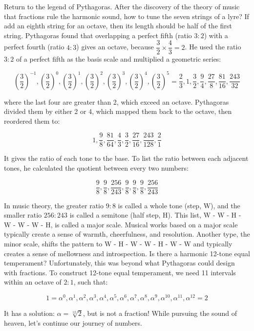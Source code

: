 \documentclass[b5paper]{article}
\begin{document}
\vspace{3mm}
Return to the legend of Pythagoras. After the discovery of the theory of music that fractions rule the harmonic sound, how to tune the seven strings of a lyre? If add an eighth string for an octave, then its length should be half of the first string. Pythagoras found that overlapping a perfect fifth (ratio $3:2$) with a perfect fourth (ratio $4:3$) gives an octave, because $\dfrac{3}{2} \times \dfrac{4}{3} = 2$. He used the ratio $3:2$ of a perfect fifth as the basis scale and multiplied a geometric series:

\[
(\frac{3}{2})^{-1}, (\frac{3}{2})^0, (\frac{3}{2})^{1}, (\frac{3}{2})^2, (\frac{3}{2})^{3}, (\frac{3}{2})^4, (\frac{3}{2})^{5} = \frac{2}{3}, 1, \frac{3}{2}, \frac{9}{4}, \frac{27}{8}, \frac{81}{16}, \frac{243}{32}
\]

where the last four are greater than 2, which exceed an octave. Pythagoras divided them by either 2 or 4, which mapped them back to the octave, then reordered them to:

\[
1, \frac{9}{8}, \frac{81}{64}, \frac{4}{3}, \frac{3}{2}, \frac{27}{16}, \frac{243}{128}, \frac{2}{1}
\]

It gives the ratio of each tone to the base. To list the ratio between each adjacent tones, he calculated the quotient between every two numbers:

\[
\frac{9}{8}, \frac{9}{8}, \frac{256}{243}, \frac{9}{8}, \frac{9}{8}, \frac{9}{8}, \frac{256}{243}
\]

In music theory, the greater ratio $9:8$ is called a whole tone (step, W), and the smaller ratio $256:243$ is called a semitone (half step, H). This list, W - W - H - W - W - W - H, is called a major scale. Musical works based on a major scale typically create a sense of warmth, cheerfulness, and resolution. Another type, the minor scale, shifts the pattern to W - H - W - W - H - W - W and typically creates a sense of mellowness and introspection. Is there a harmonic 12-tone equal temperament? Unfortunately, this was beyond what Pythagoras could design with fractions. To construct 12-tone equal temperament, we need 11 intervals within an octave of $2:1$, such that:

\[
1 = \alpha^0, \alpha^1, \alpha^2, \alpha^3, \alpha^4, \alpha^5, \alpha^6, \alpha^7, \alpha^8, \alpha^9, \alpha^{10}, \alpha^{11}, \alpha^{12} = 2
\]

It has a solution: $\alpha = \sqrt[12]{2}$, but is not a fraction! While pursuing the sound of heaven, let's continue our journey of numbers.
\end{document}
